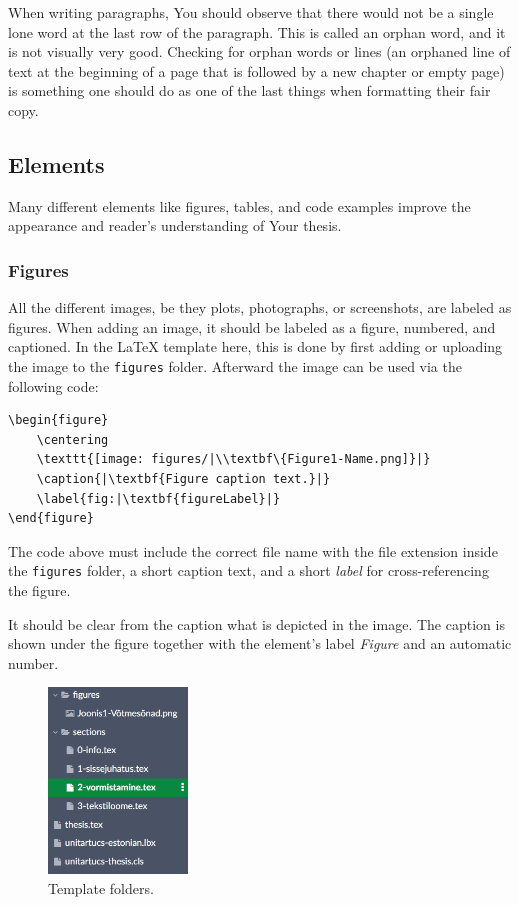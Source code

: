 When writing paragraphs, You should observe that there would not be a single lone word at the last row of the paragraph. This is called an orphan word, and it is not visually very good. Checking for orphan words or lines (an orphaned line of text at the beginning of a page that is followed by a new chapter or empty page) is something one should do as one of the last things when formatting their fair copy.

\subsection{Elements}
Many different elements like figures, tables, and code examples improve the appearance and reader’s understanding of Your thesis. 

\subsubsection{Figures}
All the different images, be they plots, photographs, or screenshots, are labeled as figures. When adding an image, it should be labeled as a figure, numbered, and captioned. In the LaTeX template here, this is done by first adding or uploading the image to the \verb|figures| folder. Afterward the image can be used via the following code:

\begin{verbatim}
\begin{figure}
    \centering
    \texttt{[image: figures/|\\textbf\{Figure1-Name.png]}|}
    \caption{|\textbf{Figure caption text.}|}
    \label{fig:|\textbf{figureLabel}|}
\end{figure}
\end{verbatim}

The code above must include the correct file name with the file extension inside the \verb|figures| folder, a short caption text, and a short \emph{label} for cross-referencing the figure.

It should be clear from the caption what is depicted in the image. The caption is shown under the figure together with the element's label \emph{Figure} and an automatic number.

\begin{figure}
    \centering
    \includegraphics[width=0.33\textwidth]{figures/Figure2-figuresFolder.png}
    \caption{Template folders.}
    \label{fig:folders}
\end{figure}

